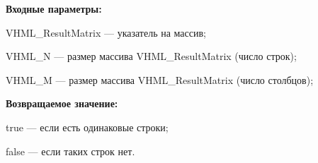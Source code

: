 \textbf{Входные параметры:}
 
VHML\_ResultMatrix --- указатель на массив;
 
VHML\_N --- размер массива VHML\_ResultMatrix (число строк);
 
VHML\_M --- размер массива VHML\_ResultMatrix (число столбцов);

\textbf{Возвращаемое значение:}

 true --- если есть одинаковые строки;
 
 false --- если таких строк нет.